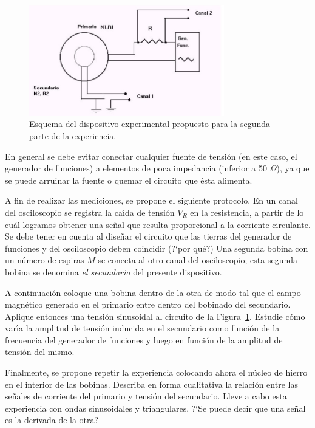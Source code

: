 \documentclass[laboratorio]{guia}
\begin{document}
\begin{figure}[t!]
    \centering
    \includegraphics[width=8.5cm]{LG04--000.png}
    \caption{Esquema del dispositivo experimental propuesto para la segunda
    parte de la experiencia.}
    \label{fig:1}
\end{figure}

En general se debe evitar conectar cualquier fuente de tensi\'on (en este caso,
el generador de funciones) a elementos de poca impedancia (inferior a 50
$\Omega$), ya que se puede arruinar la fuente o quemar el circuito que \'esta
alimenta. 

A fin de realizar las mediciones, se propone el siguiente protocolo. En un
canal del osciloscopio se registra la ca\'\i da de tensi\'on $V_R$ en la
resistencia, a partir de lo cu\'al logramos obtener una se\~nal que resulta
proporcional a la corriente circulante. Se debe tener en cuenta al dise\~nar el
circuito que las tierras del generador de funciones y del osciloscopio deben
coincidir (?`por qu\'e?) Una segunda bobina con un n\'umero de espiras $M$ se conecta al otro canal del
osciloscopio; esta segunda bobina se denomina {\it el secundario} del presente
dispositivo.

A continuaci\'on coloque una bobina dentro de la otra de modo tal que el campo
magn\'etico generado en el primario entre dentro del bobinado del secundario.
Aplique entonces una tensi\'on sinusoidal al circuito de la Figura~\ref{fig:1}.
Estudie c\'omo var\'\i a la amplitud de tensi\'on inducida en el secundario
como funci\'on de la frecuencia del generador de funciones y luego en funci\'on
de la amplitud de tensi\'on del mismo.

Finalmente, se propone repetir la experiencia colocando ahora el n\'ucleo de
hierro en el interior de las bobinas. Describa en forma cualitativa la
relaci\'on entre las se\~nales de corriente del primario y tensi\'on del
secundario. Lleve a cabo esta experiencia con ondas sinusoidales y
triangulares. ?`Se puede decir que una se\~nal es la derivada de la otra?
\end{document}
